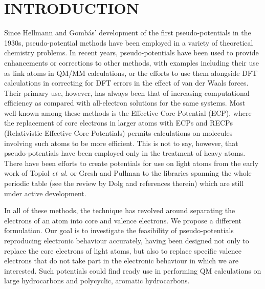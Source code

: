 \documentclass[12pt]{article}
\begin{document}


\renewcommand{\baselinestretch}{1.5}
\normalsize

\clearpage

\section*{\sffamily \Large INTRODUCTION}

Since Hellmann and Gomb\'as' development of the first pseudo-potentials in the 1930s,\cite{hellmann_1935, gombas_1935} pseudo-potential methods have been employed in a variety of theoretical chemistry problems. In recent years, pseudo-potentials have been used to provide enhancements or corrections to other methods, with examples including their use as link atoms in QM/MM calculations,%
\cite{%
singh_combined_1986,
assfeld_quantum_1996,
goedecker_separable_1996,
gao_generalized_1998,
hartwigsen_relativistic_1998,
zhang_pseudobond_1998,
dilabio_simple_2002,
von_lilienfeld_variational_2004,
von_lilienfeld_optimization_2004,
zhang_improved_2004,
von_lilienfeld_performance_2005,
dilabio_efficient_2005,
jacob_calculation_2006,
parks_pseudobond_2008,
lewin_modified_2008,
ihrig_specific_2011,
von_lilienfeld_force_2013,
hitzenberger_probing_2015,
collins_energy-based_2015,
pezeshki_recent_2015,
chung_oniom_2015,
hitzenberger_optimizing_2016} or the efforts to use them alongside DFT calculations in correcting for DFT errors in the effect of van der Waals forces.\cite{dilabio_2008} Their primary use, however, has always been that of increasing computational efficiency as compared with all-electron solutions for the same systems. Most well-known among these methods is the Effective Core Potential (ECP),\cite{dolg_2000} where the replacement of core electrons in larger atoms with ECPs and RECPs (Relativistic Effective Core Potentials) permits calculations on molecules involving such atoms to be more efficient.
This is not to say, however, that pseudo-potentials have been employed only in the treatment of heavy atoms. There have been efforts to create potentials for use on light
atoms from the early work of Topiol \emph{et al.} or Gresh and Pullman \cite{topiol_1976, gresh_1978}
to the libraries spanning the whole periodic table (see the review by Dolg\cite{dolg_relativistic_2012} and references therein) which are still under active development.\cite{zou_open_2018}

In all of these methods, the technique has revolved around separating the electrons of an atom into core and valence electrons.
We propose a different formulation.
Our goal is to investigate the feasibility of pseudo-potentials reproducing electronic behaviour accurately,
having been designed not only to replace the core electrons of light atoms,
but also to replace specific valence electrons that do not take part in the electronic behaviour in which we are interested.
Such potentials could find ready use in performing QM calculations on large hydrocarbons and polycyclic, aromatic hydrocarbons.
\end{document}
